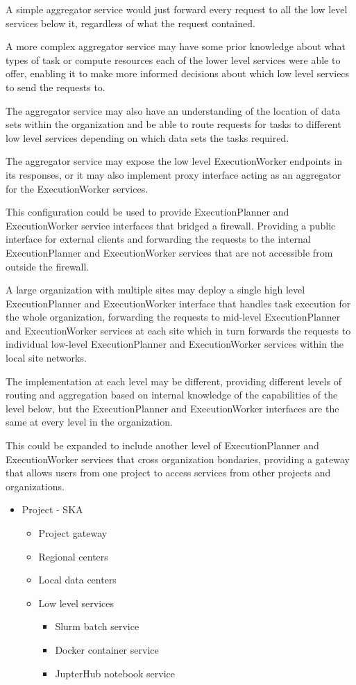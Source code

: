 \documentclass[11pt,a4paper]{ivoa}
\newcommand{\execplanner} {ExecutionPlanner}
\newcommand{\execworker} {ExecutionWorker}
\begin{document}
A simple aggregator service would just forward every request to all the low level services below it,
regardless of what the request contained.

A more complex aggregator service may have some prior knowledge about what types of task or compute resources
each of the lower level services were able to offer, enabling it to make more informed decisions about
which low level serviecs to send the requests to.

The aggregator service may also have an understanding of the location of data sets within the organization and
be able to route requests for tasks to different low level services depending on which data sets the tasks required.

The aggregator service may expose the low level \execworker{} endpoints in its responses,
or it may also implement proxy interface acting as an aggregator for the \execworker{}
services.

This configuration could be used to provide \execplanner{} and \execworker{} service interfaces
that bridged a firewall. Providing a public interface for external clients and forwarding the requests
to the internal \execplanner{} and \execworker{} services that are not accessible from outside the
firewall.

A large organization with multiple sites may deploy a single high level \execplanner{} and \execworker{}
interface that handles task execution for the whole organization, forwarding the requests to mid-level
\execplanner{} and \execworker{} services at each site which in turn forwards the requests to
individual low-level \execplanner{} and \execworker{} services within the local site networks.

The implementation at each level may be different, providing different levels of routing
and aggregation based on internal knowledge of the capabilities of the level below,
but the \execplanner{} and \execworker{} interfaces are the same at every level
in the organization.

This could be expanded to include another level of \execplanner{} and \execworker{} services that
cross organization bondaries, providing a gateway that allows users from one project to access services
from other projects and organizations.


\begin{itemize}
    \item Project - SKA
    \begin{itemize}
        \item Project gateway
        \item Regional centers
        \item Local data centers
        \item Low level services
        \begin{itemize}
            \item Slurm batch service
            \item Docker container service
            \item JupterHub notebook service
        \end{itemize}
    \end{itemize}
\end{itemize}
\end{document}
